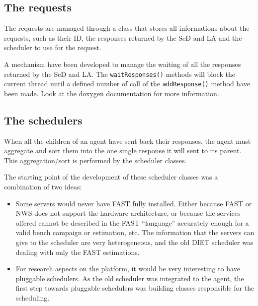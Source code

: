   \subsection{The requests}

  The requests are managed through a class that stores all informations
  about the requests, such as their ID, the responses returned by the SeD and LA
  and the scheduler to use for the request.

  A mechanism have been developed to manage the waiting of all the responses
  returned by the SeD and LA. The \texttt{waitResponses()} methods will block the
  current thread until a defined number of call of the \texttt{addResponse()}
  method have been made. Look at the doxygen documentation for more information.


  \subsection{The schedulers}

  When all the children of an agent have sent back their responses, the agent must
  aggregate and sort them into the one single response it will sent to its parent.
  This aggregation/sort is performed by the scheduler classes.

  The starting point of the development of these scheduler classes was a
  combination of two ideas:
  \begin{itemize}
  \item Some servers would never have FAST fully installed. Either because FAST or
  NWS does not support the hardware architecture, or because the services
  offered cannot be described in the FAST ``language'' accurately enough for a
  valid bench campaign or estimation, etc. The information that the servers can
  give to the scheduler are very heterogeneous, and the old DIET scheduler was
  dealing with only the FAST estimations.
  \item For research aspects on the platform, it would be very interesting to
  have pluggable schedulers. As the old scheduler was integrated to the agent,
  the first step towards pluggable schedulers was building classes responsible
  for the scheduling.
  \end{itemize}

